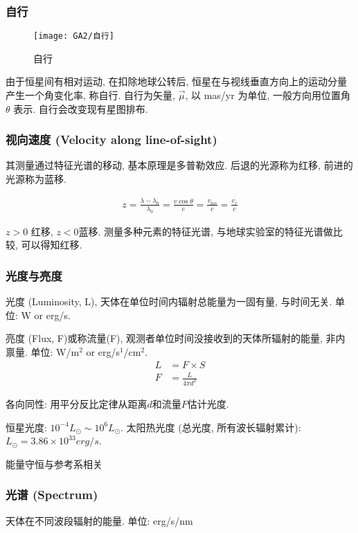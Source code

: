 \subsubsection{自行}
\begin{figure}[!htb]
    \centering
    \texttt{[image: GA2/自行]}
    \caption{自行}
\end{figure}

由于恒星间有相对运动, 在扣除地球公转后, 恒星在与视线垂直方向上的运动分量产生一个角变化率, 称自行. 自行为矢量, $\vec{\mu}$, 以 mas/yr 为单位, 一般方向用位置角 $\theta$ 表示. 自行会改变现有星图排布. 

\subsubsection{视向速度 (Velocity along line-of-sight)}
其测量通过特征光谱的移动, 基本原理是多普勒效应. 后退的光源称为红移, 前进的光源称为蓝移. 

\begin{align*}
    z=\frac{\lambda-\lambda_0}{\lambda_0}=\frac{v\cos\theta}{c}=\frac{v_{los}}{c}=\frac{v_r}{c}
\end{align*}

$z>0$ 红移, $z<0$蓝移. 测量多种元素的特征光谱, 与地球实验室的特征光谱做比较, 可以得知红移. 

\subsubsection{光度与亮度}
光度 (Luminosity, L), 天体在单位时间内辐射总能量为一固有量, 与时间无关. 单位: W or erg/s. 

亮度 (Flux, F)或称流量(F), 观测者单位时间没接收到的天体所辐射的能量, 非内禀量. 单位: W/m${}^2$ or erg/s${}^1$/cm${}^2$. 
\begin{align*}
    L&=F\times S \\
    F&=\frac{L}{4\pi d^2}
\end{align*}

各向同性: 用平分反比定律从距离$d$和流量$F$估计光度. 

恒星光度: $10^{-4}L_{\odot}\sim 10^6 L_{\odot}$.  太阳热光度 (总光度, 所有波长辐射累计): $L_{\odot}=3.86\times 10^{33}erg/s$. 

能量守恒与参考系相关

\subsubsection{光谱 (Spectrum)}
天体在不同波段辐射的能量. 单位: erg/s/nm


